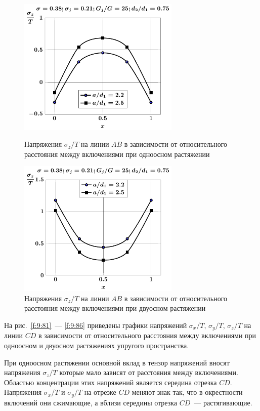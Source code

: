 \begin{figure}[h!]
\centering\footnotesize
\parbox[b]{7.5cm}{\centering\includegraphics[width=7.7cm]{inc13-a-d75-g25-t1-sig_z-ab.pdf}
\caption{Напряжения $\sigma_z/T$ на линии $AB$ в зависимости от относительного расстояния между включениями при одноосном растяжении
\label{f:9:79}}}\hfil\hfil
\parbox[b]{7.5cm}{\centering\includegraphics[width=7.7cm]{inc13-a-d75-g25-t2-sig_z-ab.pdf}
\caption{Напряжения $\sigma_z/T$ на линии $AB$ в зависимости от относительного расстояния между включениями при двуосном растяжении
\label{f:9:80}}}
\end{figure}

На рис.~\ref{f:9:81}~--- \ref{f:9:86} приведены графики напряжений $\sigma_x/T$, $\sigma_y/T$, $\sigma_z/T$ на линии $CD$ в зависимости от относительного расстояния между включениями при одноосном и двуосном растяжениях упругого пространства.

При одноосном растяжении основной вклад в тензор напряжений вносят напряжения $\sigma_z/T$ которые мало зависят от расстояния между включениями. Областью концентрации этих напряжений является середина отрезка $CD$. Напряжения $\sigma_x/T$ и $\sigma_y/T$ на отрезке $CD$ меняют знак так, что в окрестности включений они сжимающие, а вблизи середины отрезка $CD$~--- растягивающие.

